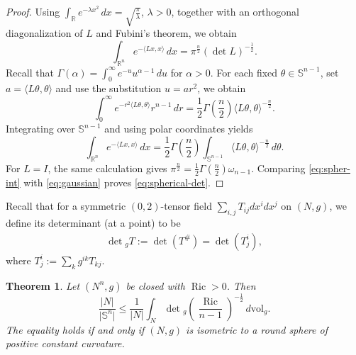 \documentclass[11pt, reqno]{amsart}
\newtheorem{theorem}{Theorem}
\begin{document}
\begin{proof}
Using $\int_{\mathbb R}e^{-\lambda x^2}\, dx =\sqrt{\frac{\pi}{\lambda}}$, $\lambda>0$,
together with an orthogonal diagonalization of $L$ and Fubini's theorem, we obtain
\begin{equation}\label{eq:gaussian}
\int_{\mathbb R^n}e^{-\langle Lx, x\rangle}\, dx
=\pi^{\frac{n}{2}}(\det L)^{-\frac{1}{2}}.
\end{equation}
Recall that $\Gamma(\alpha)=\int_0^\infty e^{-u}u^{\alpha-1}\, du$ for $\alpha>0$.
For each fixed $\theta\in\mathbb S^{n-1}$, set
$a=\langle L\theta, \theta\rangle$ and use the substitution $u=ar^2$, we obtain
$$
\int_0^\infty
e^{-r^2\langle L\theta, \theta\rangle}r^{n-1}\, dr
=
\frac12\Gamma\left(\frac n2\right)
\langle L\theta, \theta\rangle^{-\frac n2}.
$$
Integrating over $\mathbb S^{n-1}$ and using polar coordinates yields
\begin{equation}\label{eq:spher-int}
\int_{\mathbb R^n}e^{-\langle Lx, x\rangle}\, dx
=
\frac12\Gamma\left(\frac n2\right)
\int_{\mathbb S^{n-1}}
\langle L\theta, \theta\rangle^{-\frac n2}\, d\theta.
\end{equation}
For $L=I$, the same calculation gives
$\pi^{\frac{n}{2}}=\frac12\Gamma(\frac{n}{2})\omega_{n-1}$.
Comparing \eqref{eq:spher-int} with \eqref{eq:gaussian} proves
\eqref{eq:spherical-det}.
\end{proof}
Recall that for a symmetric $(0, 2)$-tensor field $\sum_{i, j}T_{ij}dx^idx^j$ on $(N, g)$, we define its determinant (at a point) to be
\begin{align*}
\det{}_g T:= \det (T^{\#})=\det (T^i_j),
\end{align*}
where $T^i_j:=\sum_k g^{ik}T_{kj}$.

\begin{theorem}\label{thm:determinant}
Let $(N^n, g)$ be closed with
$\operatorname{Ric}>0$. Then
\begin{equation*}\label{eq:determinant-bound}
\frac{\lvert N\rvert}{\lvert\mathbb S^n\rvert}
\le \frac{1}{\lvert N\rvert} \int_N \det{}_g\left(\frac{\operatorname{Ric}}{n-1}\right)^{-\frac{1}{2}} \, d\mathrm{vol}_g.
\end{equation*}
The equality holds if and only if $(N, g)$ is isometric to a round sphere of positive constant curvature.
\end{theorem}
\end{document}
